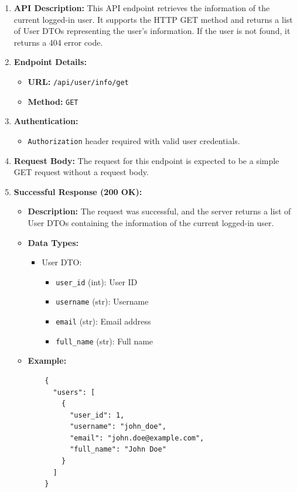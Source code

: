 \documentclass[a4 paper, 12pt]{article}
\begin{document}
\begin{enumerate}
  \item \textbf{API Description:} This API endpoint retrieves the information of the current logged-in user. It supports the HTTP GET method and returns a list of User DTOs representing the user's information. If the user is not found, it returns a 404 error code.

  \item \textbf{Endpoint Details:}
  \begin{itemize}
    \item \textbf{URL:} \texttt{/api/user/info/get}
    \item \textbf{Method:} \texttt{GET}
  \end{itemize}
  \item \textbf{Authentication:}
  \begin{itemize}
    \item \texttt{Authorization} header required with valid user credentials.
  \end{itemize}
  \item \textbf{Request Body:} The request for this endpoint is expected to be a simple GET request without a request body.

  \item \textbf{Successful Response (200 OK):}
  \begin{itemize}
    \item \textbf{Description:} The request was successful, and the server returns a list of User DTOs containing the information of the current logged-in user.
    \item \textbf{Data Types:}
    \begin{itemize}
      \item User DTO:
      \begin{itemize}
        \item \texttt{user\_id} (int): User ID
        \item \texttt{username} (str): Username
        \item \texttt{email} (str): Email address
        \item \texttt{full\_name} (str): Full name
      \end{itemize}
    \end{itemize}
    \item \textbf{Example:}
    \begin{verbatim}
    {
      "users": [
        {
          "user_id": 1,
          "username": "john_doe",
          "email": "john.doe@example.com",
          "full_name": "John Doe"
        }
      ]
    }
    \end{verbatim}
  \end{itemize}


\end{enumerate}
\end{document}

